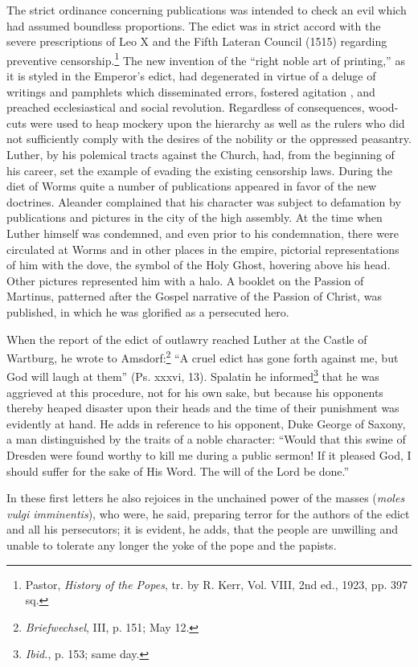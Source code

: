 The strict ordinance concerning publications was intended to
check an evil which had assumed boundless proportions. The edict
was in strict accord with the severe prescriptions of Leo X and the
Fifth Lateran Council (1515) regarding preventive censorship.\footnote
{Pastor, \textit{History of the Popes}, tr. by R. Kerr, Vol. VIII, 2nd ed., 1923, pp. 397 sq.}
The new invention of the “right noble art of printing,” as it is
styled in the Emperor’s edict, had degenerated in virtue of a deluge
of writings and pamphlets which disseminated errors, fostered agitation
, and preached ecclesiastical and social revolution. Regardless of
consequences, wood-cuts were used to heap mockery upon the hierarchy
as well as the rulers who did not sufficiently comply with the
desires of the nobility or the oppressed peasantry. Luther, by his
polemical tracts against the Church, had, from the beginning of his
career, set the example of evading the existing censorship laws.
During the diet of Worms quite a number of publications appeared
in favor of the new doctrines. Aleander complained that his character
was subject to defamation by publications and pictures in the
city of the high assembly. At the time when Luther himself was
condemned, and even prior to his condemnation, there were circulated
at Worms and in other places in the empire, pictorial representations of
him with the dove, the symbol of the Holy Ghost, hovering above his head.
Other pictures represented him with a halo. A
booklet on the Passion of Martinus, patterned after the Gospel narrative
of the Passion of Christ, was published, in which he was
glorified as a persecuted hero.

When the report of the edict of outlawry reached Luther at the
Castle of Wartburg, he wrote to Amsdorf:\footnote{\textit{Briefwechsel}, III, p. 151; May 12.}
“A cruel edict has
gone forth against me, but God will laugh at them” (Ps. xxxvi, 13).
Spalatin he informed\footnote{\textit{Ibid.}, p. 153; same day.}
that he was aggrieved at this procedure, not
for his own sake, but because his opponents thereby heaped disaster
upon their heads and the time of their punishment was evidently
at hand. He adds in reference to his opponent, Duke George of
Saxony, a man distinguished by the traits of a noble character:
“Would that this swine of Dresden were found worthy to kill me
during a public sermon! If it pleased God, I should suffer for the
sake of His Word. The will of the Lord be done.”

In these first letters he also rejoices in the unchained power of
the masses (\textit{moles vulgi imminentis}), who were, he said, preparing
terror for the authors of the edict and all his persecutors; it is evident,
he adds, that the people are unwilling and unable to tolerate any
longer the yoke of the pope and the papists.

